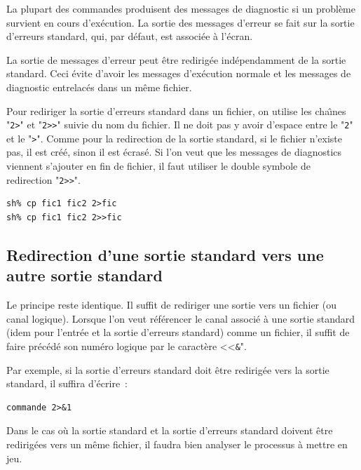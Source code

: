 La plupart des commandes {\Unix} produisent des messages de diagnostic
si un probl{\`e}me survient en cours d'ex{\'e}cution. La sortie des
messages d'erreur se fait sur la sortie d'erreurs standard, qui, par d{\'e}faut, est
associ{\'e}e {\`a} l'{\'e}cran.

La sortie de messages d'erreur peut {\^e}tre redirig{\'e}e ind{\'e}pendamment de la
sortie standard. Ceci {\'e}vite d'avoir les messages d'ex{\'e}cution normale et
les messages de diagnostic entrelac{\'e}s dans un m{\^e}me fichier.

Pour rediriger la sortie d'erreurs standard dans un fichier, on utilise
les cha{\^\i}nes "\verb=2>=" et "\verb=2>>=" suivie du nom du fichier. Il ne doit
pas y avoir d'espace entre le "\texttt{2}" et le "\verb=>=". Comme pour la
redirection de la sortie standard, si le fichier n'existe pas, il est
cr{\'e}{\'e}, sinon il est {\'e}cras{\'e}. Si l'on veut que les messages de diagnostics
viennent s'ajouter en fin de fichier, il faut utiliser le double symbole
de redirection "\verb=2>>=".

\begin{example}
\begin{verbatim}
sh% cp fic1 fic2 2>fic
sh% cp fic1 fic2 2>>fic
\end{verbatim}
\end{example}

\subsection{Redirection d'une sortie standard vers une autre sortie standard}

Le principe reste identique. Il suffit de rediriger une sortie vers un
fichier (ou canal logique). Lorsque l'on veut r{\'e}f{\'e}rencer le canal
associ{\'e} {\`a} une sortie standard (idem pour l'entr{\'e}e et la sortie d'erreurs
standard) comme un fichier, il suffit de faire pr{\'e}c{\'e}d{\'e} son num{\'e}ro
logique par le caract{\`e}re <<\texttt{\&}".

Par exemple, si la sortie d'erreurs standard doit {\^e}tre redirig{\'e}e vers la
sortie standard, il
suffira d'{\'e}crire~:
\begin{verbatim}
commande 2>&1
\end{verbatim}

Dans le cas o{\`u} la sortie standard et la sortie d'erreurs standard doivent {\^e}tre redirig{\'e}es
vers un m{\^e}me fichier, il faudra bien analyser le processus {\`a} mettre en jeu.

